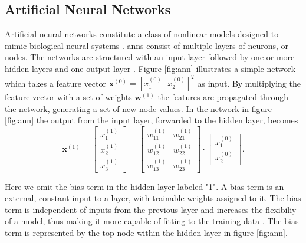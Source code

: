 

\subsection{Artificial Neural Networks}
Artificial neural networks constitute a class of nonlinear models designed to mimic biological neural systems \citep{rojas_1996}. \gls{ann}s consist of multiple layers of neurons, or nodes. The networks are structured with an input layer followed by one or more hidden layers and one output layer \citep{logan_2017}. Figure \ref{fig:ann} illustrates a simple network which takes a feature vector $\mathbf{x}^{(0)}=[x_1^{(0)}\text{ }  x_2^{(0)}]^{T}$ as input. By multiplying the feature vector with a set of weights $\mathbf{w}^{(1)}$ the features are propagated through the network, generating a set of new node values. In the network in figure \ref{fig:ann} the output from the input layer, forwarded to the hidden layer, becomes
\begin{equation}
	\mathbf{x}^{(1)}=\begin{bmatrix}x_1^{(1)} \\ x_2^{(1)} \\ x_3^{(1)} \end{bmatrix} = 
	\begin{bmatrix} w_{11}^{(1)} & w_{21}^{(1)} \\ w_{12}^{(1)} & w_{22}^{(1)} \\ w_{13}^{(1)} & w_{23}^{(1)}\end{bmatrix}\cdot \begin{bmatrix}x_1^{(0)} \\ x_2^{(0)}\end{bmatrix}.
\end{equation}

Here we omit the bias term in the hidden layer labeled "1". A bias term is an external, constant input to a layer, with trainable weights assigned to it. The bias term is independent of inputs from the previous layer and increases the flexibiliy of a model, thus making it more capable of fitting to the training data \citep{kohl_2010}. The bias term is represented by the top node within the hidden layer in figure \ref{fig:ann}. 


